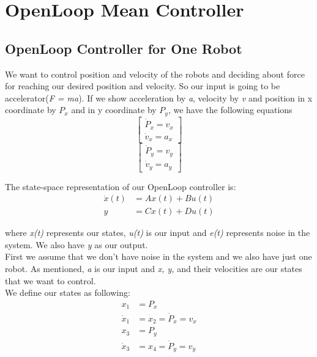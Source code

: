 \documentclass[10pt,letterpaper]{article}
\begin{document}
\section{OpenLoop Mean Controller}
\subsection{OpenLoop Controller for One Robot}
We want to control position and velocity of the robots and deciding about force for reaching our desired position and velocity. So our input is going to be accelerator(\emph{F = ma}). If we show acceleration by \emph{a}, velocity by \emph{v} and position in x coordinate by \emph{$P_x$} and in y coordinate by \emph{$P_y$}, we have the following equations
\begin{equation}
\begin{bmatrix}
\dot{P}_x = v_x \\
\dot{v}_x = a_x
\end{bmatrix}
\end{equation}
\begin{equation}
\begin{bmatrix}
\dot{P}_y = v_y \\
\dot{v}_y = a_y
\end{bmatrix}
\end{equation}



The state-space representation of our OpenLoop controller is: 
\begin{align}
\dot{x}(t)  &=  A x(t) + B u(t) \\
y &= C x(t) + D u(t)\nonumber
\end{align}


where \emph{x(t)} represents our states, \emph{u(t)} is our input and \emph{e(t)} represents noise in the system. We also have \emph{y} as our output.\\
First we assume that we don't have noise in the system and we also have just one robot. As mentioned, \emph{a} is our input and \emph{x, y,} and their velocities are our states that we want to control.\\
We define our states as following:
\begin{align}
x_1 &= P_x \\
\dot{x}_1 &= x_2 = \dot{P}_x = v_x\\
x_3 &= P_y\\
 \dot{x}_3 &= x_4 = \dot{P}_y = v_y 
\end{align}
\end{document}
